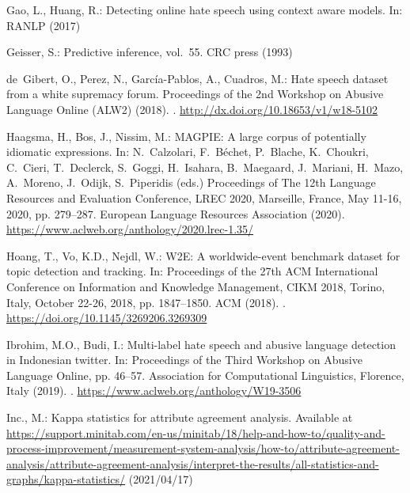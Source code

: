 \documentclass{article}
\begin{document}
\begin{thebibliography}{10}
Gao, L., Huang, R.: Detecting online hate speech using context aware models.
\newblock In: RANLP (2017)

Geisser, S.: Predictive inference, vol.~55.
\newblock CRC press (1993)

de~Gibert, O., Perez, N., García-Pablos, A., Cuadros, M.: Hate speech dataset
  from a white supremacy forum.
\newblock Proceedings of the 2nd Workshop on Abusive Language Online (ALW2)
  (2018).
\newblock {}.
\newblock \urlprefix\url{http://dx.doi.org/10.18653/v1/w18-5102}

Haagsma, H., Bos, J., Nissim, M.: {MAGPIE:} {A} large corpus of potentially
  idiomatic expressions.
\newblock In: N.~Calzolari, F.~B{\'{e}}chet, P.~Blache, K.~Choukri, C.~Cieri,
  T.~Declerck, S.~Goggi, H.~Isahara, B.~Maegaard, J.~Mariani, H.~Mazo,
  A.~Moreno, J.~Odijk, S.~Piperidis (eds.) Proceedings of The 12th Language
  Resources and Evaluation Conference, {LREC} 2020, Marseille, France, May
  11-16, 2020, pp. 279--287. European Language Resources Association (2020).
\newblock \urlprefix\url{https://www.aclweb.org/anthology/2020.lrec-1.35/}

Hoang, T., Vo, K.D., Nejdl, W.: {W2E:} {A} worldwide-event benchmark dataset
  for topic detection and tracking.
\newblock In: Proceedings of the 27th {ACM} International Conference on
  Information and Knowledge Management, {CIKM} 2018, Torino, Italy, October
  22-26, 2018, pp. 1847--1850. {ACM} (2018).
\newblock {}.
\newblock \urlprefix\url{https://doi.org/10.1145/3269206.3269309}

Ibrohim, M.O., Budi, I.: Multi-label hate speech and abusive language detection
  in {I}ndonesian twitter.
\newblock In: Proceedings of the Third Workshop on Abusive Language Online, pp.
  46--57. Association for Computational Linguistics, Florence, Italy (2019).
\newblock {}.
\newblock \urlprefix\url{https://www.aclweb.org/anthology/W19-3506}

Inc., M.: Kappa statistics for attribute agreement analysis.
\newblock Available at
  \url{https://support.minitab.com/en-us/minitab/18/help-and-how-to/quality-and-process-improvement/measurement-system-analysis/how-to/attribute-agreement-analysis/attribute-agreement-analysis/interpret-the-results/all-statistics-and-graphs/kappa-statistics/}
  (2021/04/17)


\end{thebibliography}
\end{document}
